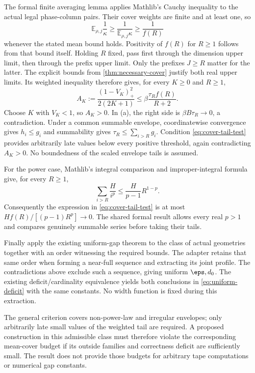 \begin{outline}
The formal finite averaging lemma applies Mathlib's Cauchy inequality to
the actual legal phase-column pairs. Their cover weights are finite and
at least one, so
\[
 \mathbb E_{\rho,j}\frac1\kappa
 \ge\frac1{\mathbb E_{\rho,j}\kappa}
 \ge\frac1{f(R)}
\]
whenever the stated mean bound holds. Positivity of $f(R)$ for $R\ge1$
follows from that bound itself. Holding $R$ fixed, pass first through the
dimension upper limit, then through the prefix upper limit. Only the
prefixes $J\ge R$ matter for the latter. The explicit bounds from
\cref{thm:necessary-cover} justify both real upper limits.
Its weighted inequality therefore gives, for every $K\ge0$ and $R\ge1$,
\[
 A_K:=\frac{(1-V_K)_+^2}{2(2K+1)}
 \le\beta\frac{\tau_R f(R)}{R+2}.
\]
Choose $K$ with $V_K<1$, so $A_K>0$. In (a), the right side is
$\beta B\tau_R\to0$, a contradiction. Under a common summable envelope,
coordinatewise convergence gives $h_i\le g_i$ and summability gives
$\tau_R\le\sum_{i>R}g_i$. Condition \cref{eq:cover-tail-test} provides
arbitrarily late values below every positive threshold, again
contradicting $A_K>0$. No boundedness of the scaled envelope tails is
assumed.

For the power case, Mathlib's integral comparison and improper-integral
formula give, for every $R\ge1$,
\[
 \sum_{i>R}\frac H{i^p}
 \le\frac H{p-1}R^{1-p}.
\]
Consequently the expression in \cref{eq:cover-tail-test} is at most
$Hf(R)/[(p-1)R^p]\to0$. The shared formal result allows every real
$p>1$ and compares genuinely summable series before taking their tails.

Finally apply the existing uniform-gap theorem to the class of actual
geometries together with an order witnessing the required bounds.
The adapter retains that same order when forming a near-full sequence
and extracting its joint profile. The contradictions above exclude such
a sequence, giving uniform $\eps,d_0$. The existing deficit/cardinality
equivalence yields both conclusions in \cref{eq:uniform-deficit} with
the same constants. No width function is fixed during this extraction.
\end{outline}

The general criterion covers non-power-law and irregular envelopes;
only arbitrarily late small values of the weighted tail are required.
A proposed construction in this admissible class must therefore violate
the corresponding mean-cover budget if its outside families and
correctness deficit are sufficiently small. The result does not provide
those budgets for arbitrary tape computations or numerical gap constants.

